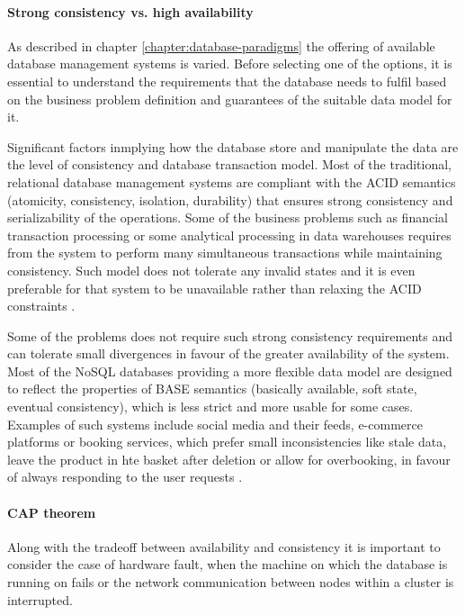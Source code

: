 \paragraph*{Strong consistency vs. high availability}

As described in chapter \ref{chapter:database-paradigms} the offering of available database management systems is varied. Before selecting one of the options, it is essential to understand the requirements that the database needs to fulfil based on the business problem definition and guarantees of the suitable data model for it. 

Significant factors inmplying how the database store and manipulate the data are the level of consistency and database transaction model. Most of the traditional, relational database management systems are compliant with the ACID semantics (atomicity, consistency, isolation, durability) that ensures strong consistency and serializability of the operations. Some of the business problems such as financial transaction processing or some analytical processing in data warehouses requires from the system to perform many simultaneous transactions while maintaining consistency. Such model does not tolerate any invalid states and it is even preferable for that system to be unavailable rather than relaxing the ACID constraints \cite{PerspectivesOnArchitectureEvolution}.

Some of the problems does not require such strong consistency requirements and can tolerate small divergences in favour of the greater availability of the system. Most of the NoSQL databases providing a more flexible data model are designed to reflect the properties of BASE semantics (basically available, soft state, eventual consistency), which is less strict and more usable for some cases. Examples of such systems include social media and their feeds, e-commerce platforms or booking services, which prefer small inconsistencies like stale data, leave the product in hte basket after deletion or allow for overbooking, in favour of always responding to the user requests \cite{NoSQLDatabaseSystemsSurveyDecisionGuidance}.

\paragraph*{CAP theorem}

Along with the tradeoff between availability and consistency it is important to consider the case of hardware fault, when the machine on which the database is running on fails or the network communication between nodes within a cluster is interrupted. 

